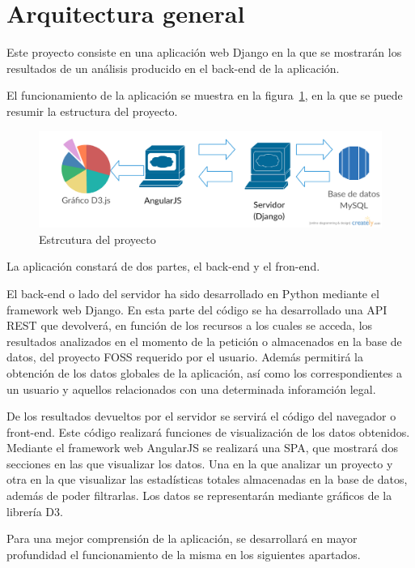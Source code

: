 \documentclass[a4paper, spanish, 12pt]{book}
\begin{document}
\section{Arquitectura general}
\label{sec:arquitectura}

Este proyecto consiste en una aplicaci\'on web Django en la que se mostrar\'an los resultados
de un an\'alisis producido en el back-end de la aplicaci\'on.

El funcionamiento de la aplicaci\'on se muestra en la figura~\ref{fig:interaction},
en la que se puede resumir la estructura del proyecto.

\begin{figure}[H]
    \centering
    \includegraphics[width=12cm, keepaspectratio]{img/technologies-interaction}
    \caption{Estrcutura del proyecto}
    \label{fig:interaction}
\end{figure}

La aplicaci\'on constar\'a de dos partes, el back-end y el fron-end.

El back-end o lado del servidor ha sido desarrollado en Python mediante el framework
web Django. En esta parte del c\'odigo se ha desarrollado una API REST que devolver\'a,
en funci\'on de los recursos a los cuales se acceda, los resultados analizados en el
momento de la petici\'on o almacenados en la base de datos, del proyecto FOSS requerido
por el usuario. Adem\'as permitir\'a la obtenci\'on de los datos globales de la aplicaci\'on,
as\'i como los correspondientes a un usuario y aquellos relacionados con una determinada
inforamci\'on legal.

De los resultados devueltos por el servidor se servir\'a el c\'odigo del navegador
o front-end. Este c\'odigo realizar\'a funciones de visualizaci\'on de los datos
obtenidos. Mediante el framework web AngularJS se realizar\'a una SPA, que mostrar\'a
dos secciones en las que visualizar los datos. Una en la que analizar un proyecto
y otra en la que visualizar las estad\'isticas totales almacenadas en la base de datos,
adem\'as de poder filtrarlas. Los datos se representar\'an mediante gr\'aficos de la
librer\'ia D3.

Para una mejor comprensi\'on de la aplicaci\'on, se desarrollar\'a en mayor profundidad
el funcionamiento de la misma en los siguientes apartados.
\end{document}
